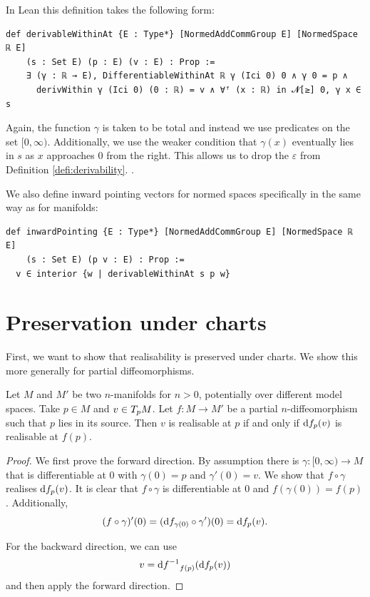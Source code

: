 In Lean this definition takes the following form: 

\begin{lstlisting}
def derivableWithinAt {E : Type*} [NormedAddCommGroup E] [NormedSpace ℝ E] 
    (s : Set E) (p : E) (v : E) : Prop :=
    ∃ (γ : ℝ → E), DifferentiableWithinAt ℝ γ (Ici 0) 0 ∧ γ 0 = p ∧
      derivWithin γ (Ici 0) (0 : ℝ) = v ∧ ∀ᶠ (x : ℝ) in 𝓝[≥] 0, γ x ∈ s
\end{lstlisting}

Again, the function $\gamma$ is taken to be total and instead we use predicates on the set $[0, \infty)$. 
Additionally, we use the weaker condition that $\gamma (x)$ eventually lies in $s$ as $x$ approaches $0$ from the right. 
This allows us to drop the $\varepsilon$ from Definition \ref{defi:derivability}.
. 

We also define inward pointing vectors for normed spaces specifically in the same way as for manifolds: 

\begin{lstlisting}
def inwardPointing {E : Type*} [NormedAddCommGroup E] [NormedSpace ℝ E] 
    (s : Set E) (p v : E) : Prop :=
  v ∈ interior {w | derivableWithinAt s p w}
\end{lstlisting}

\section{Preservation under charts}

First, we want to show that realisability is preserved under charts. 
We show this more generally for partial diffeomorphisms. 

\begin{lem}\label{lem:invariantRealisable}
Let $M$ and $M'$ be two $n$-manifolds for $n > 0$, potentially over different model spaces. 
Take $p \in M$ and $v \in T_{p}M$. 
Let $f \colon M \to M'$ be a partial $n$-diffeomorphism such that $p$ lies in its source.
Then $v$ is realisable at $p$ if and only if $\text{d}{f}_{p}(v)$ is realisable at $f (p)$.
\end{lem}

\begin{proof}
We first prove the forward direction. 
By assumption there is $\gamma \colon [0, \infty) \to M$ that is differentiable at $0$ with $\gamma (0) = p$ and $\gamma'(0) = v$. 
We show that $f \circ \gamma$ realises $\text{d}{f}_{p}(v)$. 
It is clear that $f \circ \gamma$ is differentiable at $0$ and $f (\gamma (0)) = f (p)$. 
Additionally,
\begin{equation*}
(f \circ \gamma)' (0) = (\text{d}{f}_{\gamma (0)} \circ \gamma') (0) = \text{d}{f}_{p}(v).
\end{equation*}

For the backward direction, we can use
\begin{equation*}
v = \text{d}{f^{-1}}_{f(p)}(\text{d}{f}_{p}(v))
\end{equation*}
and then apply the forward direction. 
\end{proof}

